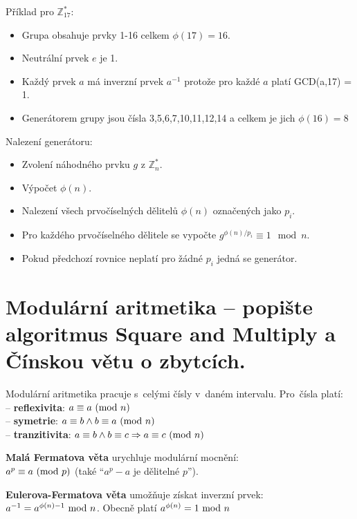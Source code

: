 \vspace{2cm}
Příklad pro $\mathbb{Z}^*_{17}$:
\begin{itemize}[noitemsep]
    \item Grupa obsahuje prvky 1-16 celkem $\phi(17) = 16$.
    \item Neutrální prvek $e$ je 1.
    \item Každý prvek $a$ má inverzní prvek $a^{-1}$ protože pro každé $a$ platí GCD(a,17) = 1.
    \item Generátorem grupy jsou čísla 3,5,6,7,10,11,12,14 a celkem je jich $\phi(16) = 8$
\end{itemize}

Nalezení generátoru:
\begin{itemize}[noitemsep]
    \item Zvolení náhodného prvku $g$ z $\mathbb{Z}_n^*$.
    \item Výpočet $\phi(n)$.
    \item Nalezení všech prvočíselných dělitelů $\phi(n)$ označených jako $p_i$.
    \item Pro každého prvočíselného dělitele se vypočte $g^{\phi(n)/p_i} \equiv 1 \mod n$.
    \item Pokud předchozí rovnice neplatí pro žádné $p_i$ jedná se generátor.
\end{itemize}



\clearpage
\section{Modulární aritmetika -- popište algoritmus Square and Multiply a Čínskou větu o zbytcích.}

Modulární aritmetika pracuje s~celými čísly v~daném intervalu. Pro~čísla platí: \\
-- \textbf{reflexivita}: $a \equiv a \ (\mathrm{mod}\ n)$ \\
-- \textbf{symetrie}: $a \equiv b \wedge b \equiv a \ (\mathrm{mod}\ n)$ \\
-- \textbf{tranzitivita}: $a \equiv b \wedge b \equiv c \Rightarrow a \equiv c \ (\mathrm{mod}\ n)$

\vspace*{1em} \noindent
\textbf{Malá Fermatova věta} urychluje modulární mocnění: \\
$a^p \equiv a \ (\mathrm{mod}\ p)$ (také \enquote{$a^p - a$ je dělitelné $p$}).

\vspace*{1em} \noindent
\textbf{Eulerova-Fermatova věta} umožňuje získat inverzní prvek: \\
$a^{-1} = a^{\phi(n) - 1} \ \mathrm{mod}\ n$. Obecně platí $a^{\phi(n)} = 1 \ \mathrm{mod}\ n$

